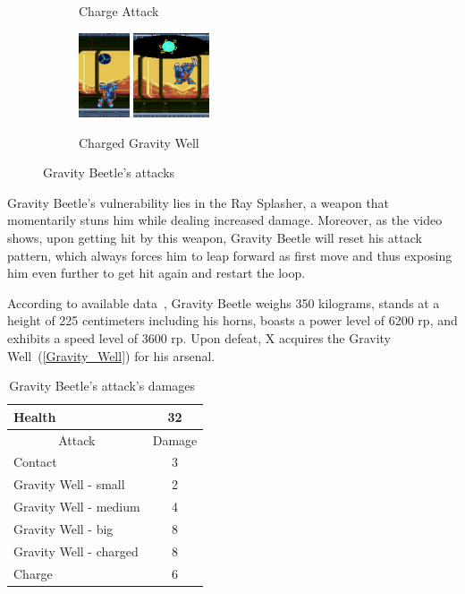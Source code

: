 \begin{figure}[htp]
\begin{subfigure}{\linewidth}
		\caption{Charge Attack}
	\end{subfigure}
	\begin{subfigure}{\linewidth}
		\centering
		\includegraphics[height=2.5cm]{figures/X3/Gravity_beetle/Beetle_hole_1.jpg}
		\includegraphics[height=2.5cm]{figures/X3/Gravity_beetle/Beetle_hole_2.jpg}
		\caption{Charged Gravity Well}
	\end{subfigure}
		\caption{Gravity Beetle's attacks}
	
\end{figure}

Gravity Beetle's vulnerability lies in the Ray Splasher, a weapon that momentarily stuns him while dealing increased damage. Moreover, as the video  shows, upon getting hit by this weapon, Gravity Beetle will reset his attack pattern, which always forces him to leap forward as first move and thus exposing him even further to get hit again and restart the loop.


According to available data~\cite{wayback:X3_resources}, Gravity Beetle weighs 350 kilograms, stands at a height of 225 centimeters including his horns, boasts a power level of 6200 rp, and exhibits a speed level of 3600 rp. Upon defeat, X acquires the Gravity Well~(\ref{Gravity_Well}) for his arsenal.
\begin{table}[htp]
	\centering
	\begin{tabular}[h]{l c}
		\toprule
		Health  & 32\\
		\midrule
		\multicolumn{1}{c}{Attack} & \multicolumn{1}{c}{Damage}\\
		Contact & 3\\
		Gravity Well - small & 2\\
		Gravity Well - medium & 4\\
		Gravity Well - big & 8\\
		Gravity Well - charged & 8\\
		Charge& 6\\
		\bottomrule
	\end{tabular}
	\caption{Gravity Beetle's attack's damages~\cite{wiki:Gravity_beetle,book:Compendium}}
\end{table} 
 
